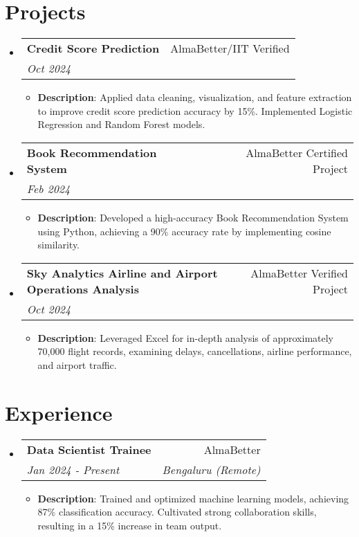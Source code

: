 \documentclass[a4paper,12pt]{article}
\makeatletter
\newcommand{\resumeItem}[2]{
  \item\small{
    \textbf{#1}{: #2 \vspace{-2pt}}
  }
}
\newcommand{\resumeSubheading}[4]{
  \vspace{-1pt}\item
    \begin{tabular*}{0.97\textwidth}{l@{\extracolsep{\fill}}r}
      \textbf{#1} & #2 \\
      \textit{#3} & \textit{#4} \\
    \end{tabular*}\vspace{-5pt}
}
\newcommand{\resumeSubHeadingListStart}{\begin{itemize}[leftmargin=*]}
\newcommand{\resumeSubHeadingListEnd}{\end{itemize}}
\newcommand{\resumeItemListStart}{\begin{itemize}}
\newcommand{\resumeItemListEnd}{\end{itemize}\vspace{-5pt}}
\makeatother
\begin{document}
\section{Projects}
\resumeSubHeadingListStart
\resumeSubheading{Credit Score Prediction}{AlmaBetter/IIT Verified}{Oct 2024}{}
\resumeItemListStart
\resumeItem{Description}{Applied data cleaning, visualization, and feature extraction to improve credit score prediction accuracy by 15\%. Implemented Logistic Regression and Random Forest models.}
\resumeItemListEnd

\resumeSubheading{Book Recommendation System}{AlmaBetter Certified Project}{Feb 2024}{}
\resumeItemListStart
\resumeItem{Description}{Developed a high-accuracy Book Recommendation System using Python, achieving a 90\% accuracy rate by implementing cosine similarity. }
\resumeItemListEnd

\resumeSubheading{Sky Analytics Airline and Airport Operations Analysis}{AlmaBetter Verified Project}{Oct 2024}{}
\resumeItemListStart
\resumeItem{Description}{Leveraged Excel for in-depth analysis of approximately 70,000 flight records, examining delays, cancellations, airline performance, and airport traffic.}
\resumeItemListEnd
\resumeSubHeadingListEnd

\vspace{-5pt}
\section{Experience}
\resumeSubHeadingListStart
\resumeSubheading{Data Scientist Trainee}{AlmaBetter}{Jan 2024 - Present}{Bengaluru (Remote)}
\resumeItemListStart
\resumeItem{Description}{Trained and optimized machine learning models, achieving 87\% classification accuracy. Cultivated strong collaboration skills, resulting in a 15\% increase in team output.}
\resumeItemListEnd

\resumeSubHeadingListEnd
\end{document}
